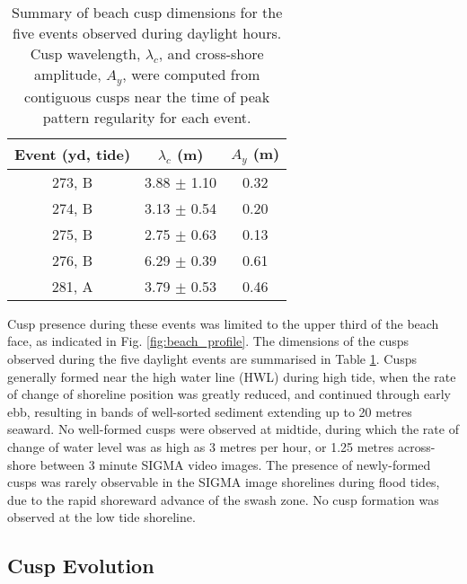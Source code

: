 \begin{table}[tbp!]
	\caption[Beach cusp dimensions by tide: Advocate 2015 experiment]{Summary of beach cusp dimensions for the five events observed during daylight hours. Cusp wavelength, $\lambda_c$, and cross-shore amplitude, $A_y$, were computed from contiguous cusps near the time of peak pattern regularity for each event.} %
	\label{table:cusps}
	\centering
	\begin{tabular}{ccc}
		\hline
		Event (yd, tide) & $\lambda_c$ (m) & $A_y$ (m)\\
		\hline
		273, B & 3.88 $\pm$ 1.10 & 0.32\\
		274, B & 3.13 $\pm$ 0.54 & 0.20\\
		275, B & 2.75 $\pm$ 0.63 & 0.13\\
		276, B & 6.29 $\pm$ 0.39 & 0.61\\
		281, A & 3.79 $\pm$ 0.53 & 0.46\\
		\hline
	\end{tabular}
\end{table}

Cusp presence during these events was limited to the upper third of the beach face, as indicated in Fig. \ref{fig:beach_profile}. The dimensions of the cusps observed during the five daylight events are summarised in Table \ref{table:cusps}. Cusps generally formed near the high water line (HWL) during high tide, when the rate of change of shoreline position was greatly reduced, and continued through early ebb, resulting in bands of well-sorted sediment extending up to 20 metres seaward. No well-formed cusps were observed at midtide, during which the rate of change of water level was as high as 3 metres per hour, or 1.25 metres across-shore between 3 minute SIGMA video images. The presence of newly-formed cusps was rarely observable in the SIGMA image shorelines during flood tides, due to the rapid shoreward advance of the swash zone. No cusp formation was observed at the low tide shoreline.


\subsection{Cusp Evolution}  

